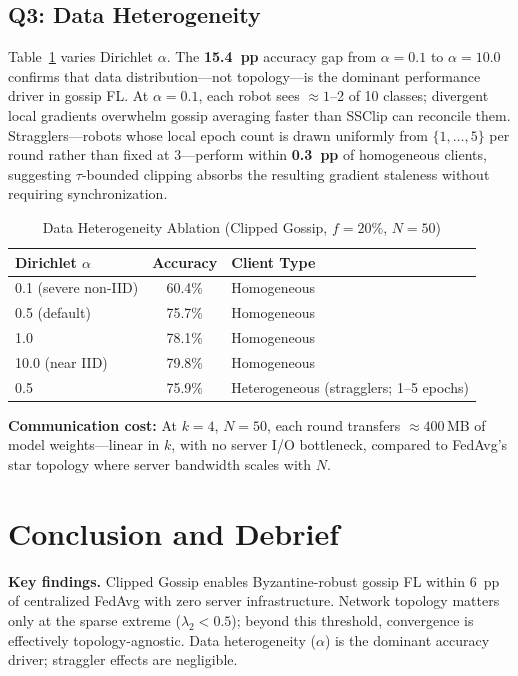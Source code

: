 \documentclass[conference]{IEEEtran}
\begin{document}
\subsection{Q3: Data Heterogeneity}

Table~\ref{tab:noniid} varies Dirichlet $\alpha$.
The \textbf{15.4~pp} accuracy gap from $\alpha{=}0.1$ to $\alpha{=}10.0$
confirms that data distribution---not topology---is the dominant performance
driver in gossip FL.
At $\alpha{=}0.1$, each robot sees ${\approx}1$--2 of 10 classes; divergent
local gradients overwhelm gossip averaging faster than SSClip can reconcile
them.
Stragglers---robots whose local epoch count is drawn uniformly from
$\{1,\ldots,5\}$ per round rather than fixed at 3---perform within
\textbf{0.3~pp} of homogeneous clients, suggesting $\tau$-bounded clipping
absorbs the resulting gradient staleness without requiring synchronization.

\begin{table}[h]
\centering
\caption{Data Heterogeneity Ablation (Clipped Gossip, $f{=}20\%$, $N{=}50$)}
\label{tab:noniid}
\begin{tabular}{@{}lcl@{}}
\toprule
Dirichlet $\alpha$ & Accuracy & Client Type \\
\midrule
0.1 (severe non-IID) & 60.4\% & Homogeneous \\
0.5 (default)        & 75.7\% & Homogeneous \\
1.0                  & 78.1\% & Homogeneous \\
10.0 (near IID)      & 79.8\% & Homogeneous \\
0.5                  & 75.9\% & Heterogeneous (stragglers; 1--5 epochs) \\
\bottomrule
\end{tabular}
\end{table}

\textbf{Communication cost:} At $k{=}4$, $N{=}50$, each round transfers
${\approx}400$\,MB of model weights---linear in $k$, with no server I/O
bottleneck, compared to FedAvg's star topology where server bandwidth scales
with $N$.

\section{Conclusion and Debrief}

\textbf{Key findings.}
Clipped Gossip enables Byzantine-robust gossip FL within 6~pp of centralized
FedAvg with zero server infrastructure.
Network topology matters only at the sparse extreme ($\lambda_2 {<} 0.5$);
beyond this threshold, convergence is effectively topology-agnostic.
Data heterogeneity ($\alpha$) is the dominant accuracy driver; straggler
effects are negligible.
\end{document}
